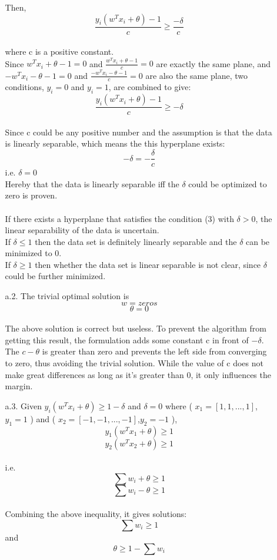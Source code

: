 \begin{enumerate}
\begin{enumerate}
		 Then,\\
		 \[\frac{y_i(w^Tx_i+\theta)-1}{c}\geq\frac{-\delta}{c}\]\\
		 where c is a positive constant.\\
		 Since \(w^Tx_i+\theta-1=0\) and \(\frac{w^Tx_i+\theta-1}{c}=0\) are exactly the same plane, and \(-w^Tx_i-\theta-1=0\) and \(\frac{-w^Tx_i-\theta-1}{c}=0\) are also the same plane, two conditions, \(y_i=0\) and \(y_i=1\), are combined to give:
		 \[\frac{y_i(w^Tx_i+\theta)-1}{c}\geq-\delta\]\\
		 Since c could be any positive number and the assumption is that the data is linearly separable, which means the this hyperplane exists:
		 \[-\delta=-\frac{\delta}{c}\]
		 i.e. \(\delta=0\)\\
		 Hereby that the data is linearly separable iff the \(\delta\) could be optimized to zero is proven.\\
		 \\If there exists a hyperplane that satisfies the condition (3) with \(\delta>0\), the linear separability of the data is uncertain.\\
		 If \(\delta\leq 1\) then the data set is definitely linearly separable and the \(\delta\) can be minimized to 0.\\
		 If \(\delta\geq 1\) then whether the data set is linear separable is not clear, since \(\delta\) could be further minimized.\\
		\item[a.2.] The trivial optimal solution is
					\[w=zeros\]
					\[\theta=0\]\\
					The above solution is correct but useless. To prevent the algorithm from getting this result, the formulation adds some constant c in front of \(-\delta\). The \(c-\theta\) is greater than zero and prevents the left side from converging to zero, thus avoiding the trivial solution. While the value of c does not make great differences as long as it's greater than 0, it only influences the margin.
		\item[a.3.] Given  \(y_i(w^Tx_i+\theta)\geq  1-\delta\) and \(\delta=0\) where ( \(x_1=[1,1,...,1]\),\(y_1=1\) ) and ( \(x_2=[-1,-1,...,-1]\),\(y_2=-1\) ),
		\[y_1(w^Tx_1+\theta )\geq1\]
		\[y_2(w^Tx_2+\theta )\geq1\]\\
		i.e.
		\[\sum w_i + \theta \geq 1\]
		\[\sum w_i -\theta \geq 1\]\\
		Combining the above inequality, it gives solutions:\\
		\[\sum w_i\geq 1\] and \[\theta \geq 1-\sum w_i\]


\end{enumerate}
\end{enumerate}
